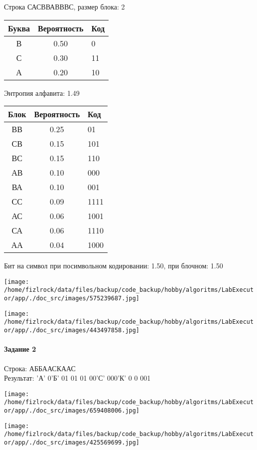 \documentclass[a4paper, 12pt]{article}
\begin{document}
Строка САСВВАВВВС, размер блока: 2
\begin{center}
 \begin{tabular}{ |c|c|l| } 
  \hline
     Буква & Вероятность & Код\\ \hline
В & 0.50 & 0\\\hline
С & 0.30 & 11\\\hline
А & 0.20 & 10
\\ \hline \end{tabular}
\end{center}
Энтропия алфавита: 1.49
\begin{center}
 \begin{tabular}{ |c|c|l| } 
  \hline
     Блок & Вероятность & Код\\ \hline
ВВ & 0.25 & 01\\\hline
СВ & 0.15 & 101\\\hline
ВС & 0.15 & 110\\\hline
АВ & 0.10 & 000\\\hline
ВА & 0.10 & 001\\\hline
СС & 0.09 & 1111\\\hline
АС & 0.06 & 1001\\\hline
СА & 0.06 & 1110\\\hline
АА & 0.04 & 1000
\\ \hline \end{tabular}
\end{center}
Бит на символ при посимвольном кодировании: 1.50, при блочном: 1.50

\texttt{[image: /home/fizlrock/data/files/backup/code\_backup/hobby/algoritms/LabExecutor/app/./doc\_src/images/575239687.jpg]}

\texttt{[image: /home/fizlrock/data/files/backup/code\_backup/hobby/algoritms/LabExecutor/app/./doc\_src/images/443497858.jpg]}
\pagebreak
\paragraph{Задание 2}

Строка: 
АББААСКААС\\
Результат: 'А' 0'Б' 01 01 01 00'С' 000'К' 0 0 001

\texttt{[image: /home/fizlrock/data/files/backup/code\_backup/hobby/algoritms/LabExecutor/app/./doc\_src/images/659408006.jpg]}

\texttt{[image: /home/fizlrock/data/files/backup/code\_backup/hobby/algoritms/LabExecutor/app/./doc\_src/images/425569699.jpg]}
\end{document}

